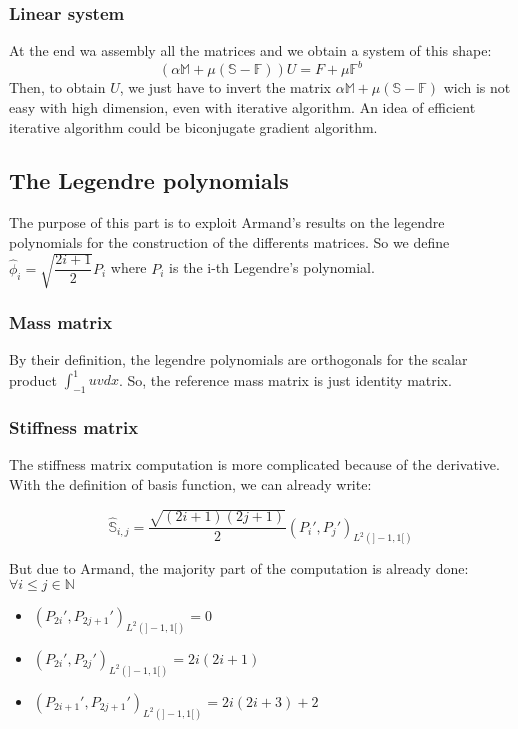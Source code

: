 \documentclass[a4paper,10pt,draft]{article}
\begin{document}
\fi

\subsubsection{Linear system}
At the end wa assembly all the matrices and we obtain a system of this shape:
\begin{equation}
\left(\alpha \mathbb{M} + \mu (\mathbb{S}-\mathbb{F})\right) U = F + \mu \mathbb{F}^b
\end{equation}
Then, to obtain $U$, we just have to invert the matrix $\alpha \mathbb{M} + \mu 
(\mathbb{S}-\mathbb{F})$ wich is not easy with high dimension, even with iterative algorithm. An 
idea of efficient iterative algorithm could be biconjugate gradient algorithm.

\subsection{The Legendre polynomials}

The purpose of this part is to exploit Armand's results on the legendre polynomials for the 
construction of the differents matrices. So we define $\hat \phi_i = \sqrt{\dfrac{2i+1}{2}} P_i$ 
where $P_i$ is the i-th Legendre's polynomial.

\subsubsection{Mass matrix}
By their definition, the legendre polynomials are orthogonals for the scalar product 
$\int_{-1}^1 uv dx$. So, the reference mass matrix is just identity matrix.

\subsubsection{Stiffness matrix}
The stiffness matrix computation is more complicated because of the derivative. With the 
definition of basis function, we can already write:

\begin{equation*}
 \widehat{\mathbb{S}}_{i,j} = \frac{\sqrt{(2i+1)(2j+1)}}{2} \left( P_i' , P_j' \right)_{L^2(]-1,1[)}
\end{equation*}

But due to Armand, the majority part of the computation is already done: $\forall i\leq j \in 
\mathbb{N}$
\begin{itemize}
 \item $\left(P_{2i}',P_{2j+1}'\right)_{L^2(]-1,1[)} = 0$
 \item $\left(P_{2i}',P_{2j}'\right)_{L^2(]-1,1[)} = 2i(2i+1)$
 \item $\left(P_{2i+1}',P_{2j+1}'\right)_{L^2(]-1,1[)} = 2i(2i+3)+2$
\end{itemize}
\end{document}
